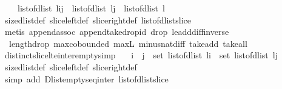 \begin{isabellebody}
\ \ \ \ {\isacharparenleft}list{\isacharunderscore}of{\isacharunderscore}dlist\ {\isacharparenleft}l{\isasymdagger}i{\isachardot}{\isachardot}j{\isacharparenright}{\isacharparenright}\ {\isacharat}\ {\isacharparenleft}list{\isacharunderscore}of{\isacharunderscore}dlist\ {\isacharparenleft}l{\isasymdagger}j{\isachardot}{\isachardot}{\isacharparenright}{\isacharparenright}{\isacharparenright}\ {\isacharequal}\ list{\isacharunderscore}of{\isacharunderscore}dlist\ l{\isachardoublequoteclose}\isanewline
%
\isadelimproof
%
\endisadelimproof
%
\isatagproof
{}\isamarkupfalse%
\ size{\isacharunderscore}dlist{\isacharunderscore}def\ slice{\isacharunderscore}left{\isacharunderscore}def\ slice{\isacharunderscore}right{\isacharunderscore}def\ list{\isacharunderscore}of{\isacharunderscore}dlist{\isacharunderscore}slice\ \isanewline
{}\isamarkupfalse%
\ {\isacharparenleft}metis\ append{\isacharunderscore}assoc\ append{\isacharunderscore}take{\isacharunderscore}drop{\isacharunderscore}id\ drop{\isacharunderscore}{}\ le{\isacharunderscore}add{\isacharunderscore}diff{\isacharunderscore}inverse\ \isanewline
\ \ length{\isacharunderscore}drop\ max{\isachardot}cobounded{}\ max{\isacharunderscore}{}L\ minus{\isacharunderscore}nat{\isachardot}diff{\isacharunderscore}{}\ take{\isacharunderscore}add\ take{\isacharunderscore}all{\isacharparenright}%
\endisatagproof
{\isafoldproof}%
%
\isadelimproof
\isanewline
%
\endisadelimproof
\isanewline
{}\isamarkupfalse%
\ distinct{\isacharunderscore}slice{\isacharunderscore}lte{\isacharunderscore}inter{\isacharunderscore}empty{\isacharbrackleft}simp{\isacharbrackright}{\isacharcolon}\ \isanewline
\ \ {\isachardoublequoteopen}i\ {\isasymle}\ j\ {\isasymLongrightarrow}\ set\ {\isacharparenleft}list{\isacharunderscore}of{\isacharunderscore}dlist\ {\isacharparenleft}l{\isasymdagger}{\isachardot}{\isachardot}i{\isacharparenright}{\isacharparenright}\ {\isasyminter}\ set\ {\isacharparenleft}list{\isacharunderscore}of{\isacharunderscore}dlist\ {\isacharparenleft}l{\isasymdagger}j{\isachardot}{\isachardot}{\isacharparenright}{\isacharparenright}\ {\isacharequal}\ {\isacharbraceleft}{\isacharbraceright}{\isachardoublequoteclose}\isanewline
%
\isadelimproof
%
\endisadelimproof
%
\isatagproof
{}\isamarkupfalse%
\ size{\isacharunderscore}dlist{\isacharunderscore}def\ slice{\isacharunderscore}left{\isacharunderscore}def\ slice{\isacharunderscore}right{\isacharunderscore}def\isanewline
{}\isamarkupfalse%
\ {\isacharparenleft}simp\ add{\isacharcolon}\ Dlist{\isacharunderscore}empty{\isacharunderscore}seq{\isacharunderscore}inter\ list{\isacharunderscore}of{\isacharunderscore}dlist{\isacharunderscore}slice\ {\isacharparenright}%

\end{isabellebody}
